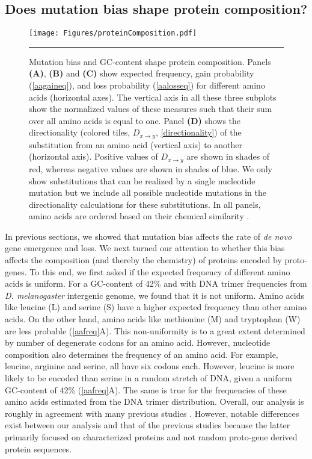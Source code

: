 \documentclass[12pt,a4paper]{article}
\begin{document}
\subsection{Does mutation bias shape protein composition?}

\begin{figure}[!t]
\centering
\texttt{[image: Figures/proteinComposition.pdf]}

\caption{Mutation bias and GC-content shape protein composition. Panels \textbf{(A)}, \textbf{(B)} and \textbf{(C)} show expected frequency, gain probability (\autoref{aagaineq}), and loss probability (\autoref{aalosseq}) for different amino acids (horizontal axes). The vertical axis in all these three subplots show the normalized values of these measures such that their sum over all amino acids is equal to one. Panel \textbf{(D)} shows the directionality (colored tiles, $\textit{D}_{x\to y}$, \autoref{directionality}) of the substitution from an amino acid (vertical axis) to another (horizontal axis). Positive values of $\textit{D}_{x\to y}$ are shown in shades of red, whereas negative values are shown in shades of blue. We only show substitutions that can be realized by a single nucleotide mutation but we include all possible nucleotide mutations in the directionality calculations for these substitutions. In all panels, amino acids are ordered based on their chemical similarity \citep{PMBEC}.}
\label{aafreq}

\vspace{1ex}
\hrule
\end{figure}

In previous sections, we showed that mutation bias affects the rate of \textit{de novo} gene emergence and loss. We next turned our attention to whether this bias affects the composition (and thereby the chemistry) of proteins encoded by proto-genes. To this end, we first asked if the expected frequency of different amino acids is uniform. For a GC-content of 42\% and with DNA trimer frequencies from \textit{D. melanogaster} intergenic genome, we found that it is not uniform. Amino acids like leucine (L) and serine (S) have a higher expected frequency than other amino acids. On the other hand, amino acids like methionine (M) and tryptophan (W) are less probable (\autoref{aafreq}{\color{blue}A}). This non-uniformity is to a great extent determined by number of degenerate codons for an amino acid. However, nucleotide composition also determines the frequency of an amino acid. For example, leucine, arginine and serine, all have six codons each. However, leucine is more likely to be encoded than serine in a random stretch of DNA, given a uniform GC-content of 42\% (\autoref{aafreq}{\color{blue}A}). The same is true for the frequencies of these amino acids estimated from the DNA trimer distribution. Overall, our analysis is roughly in agreement with many previous studies \citep{aasubOhta,aafreq3,aafreq4}. However, notable differences exist between our analysis and that of the previous studies because the latter primarily focused on characterized proteins and not random proto-gene derived protein sequences. 
\end{document}
